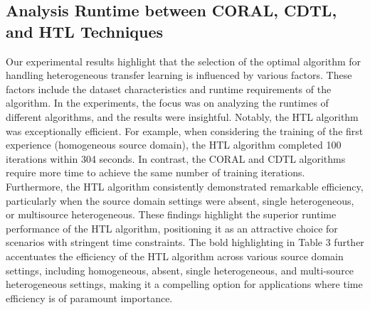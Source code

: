 \subsection{Analysis Runtime between CORAL, CDTL, and HTL Techniques}
Our experimental results highlight that the selection of the optimal algorithm for handling heterogeneous transfer learning is influenced by various factors. These factors include the dataset characteristics and runtime requirements of the algorithm. In the experiments, the focus was on analyzing the runtimes of different algorithms, and the results were insightful. Notably, the HTL algorithm was exceptionally efficient. For example, when considering the training of the first experience (homogeneous source domain), the HTL algorithm completed 100 iterations within 304 seconds. In contrast, the CORAL and CDTL algorithms require more time to achieve the same number of training iterations. Furthermore, the HTL algorithm consistently demonstrated remarkable efficiency, particularly when the source domain settings were absent, single heterogeneous, or multisource heterogeneous. These findings highlight the superior runtime performance of the HTL algorithm, positioning it as an attractive choice for scenarios with stringent time constraints. The bold highlighting in Table 3 further accentuates the efficiency of the HTL algorithm across various source domain settings, including homogeneous, absent, single heterogeneous, and multi-source heterogeneous settings, making it a compelling option for applications where time efficiency is of paramount importance.

\begin{table}[h]
  \centering
  \caption{Runtimes (in seconds) for CORAL, CDTL, and HTL.}
  \label{table:6_table3}
  \end{table}
  
